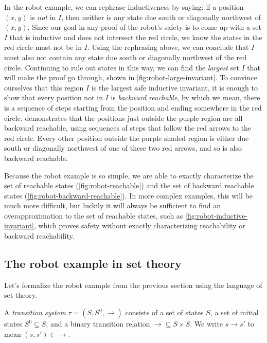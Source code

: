 In the robot example, we can rephrase inductiveness by saying:
  if a position $(x, y)$ is \emph{not} in $I$,
  then neither is any state due south or diagonally northwest of $(x, y)$.
Since our goal in any proof of the robot's safety is
  to come up with a set $I$ that is inductive and does not intersect the red circle,
  we know the states in the red circle must not be in $I$.
Using the rephrasing above,
  we can conclude that $I$ must also not contain
  any state due south or diagonally northwest of the red circle.
Continuing to rule out states in this way,
  we can find the \emph{largest} set $I$ that will make the proof go through,
  shown in \cref{fig:robot-large-invariant}.
To convince ourselves that this region $I$ is the largest safe inductive invariant,
  it is enough to show that every position not in $I$ is \emph{backward reachable},
  by which we mean, there is a sequence of steps
  starting from the position and ending somewhere in the red circle.
 demonstrates that
  the positions just outside the purple region are all backward reachable,
  using sequences of steps that follow the red arrows to the red circle.
Every other position outside the purple shaded region
  is either due south or diagonally northwest of one of these two red arrows,
  and so is also backward reachable.

Because the robot example is so simple,
  we are able to exactly characterize
    the set of reachable states (\cref{fig:robot-reachable}) and
    the set of backward reachable states (\cref{fig:robot-backward-reachable}).
In more complex examples, this will be much more difficult,
  but luckily it will always be sufficient to find an overapproximation
  to the set of reachable states, such as \cref{fig:robot-inductive-invariant},
  which proves safety without exactly characterizing
  reachability or backward reachability.

\subsection{The robot example in set theory}

\def\robot{\ensuremath{\mathsf{robot}}}
\def\reach{\ensuremath{\mathsf{reach}}}

Let's formalize the robot example from the previous section
  using the language of set theory.

A \emph{transition system} $\tau = (S, S^0, \to)$ consists of a set of states $S$,
  a set of initial states $S^0\subseteq S$,
  and a binary transition relation $\to\subseteq S\times S$.
We write $s\to s'$ to mean $(s, s') \in \to$.

